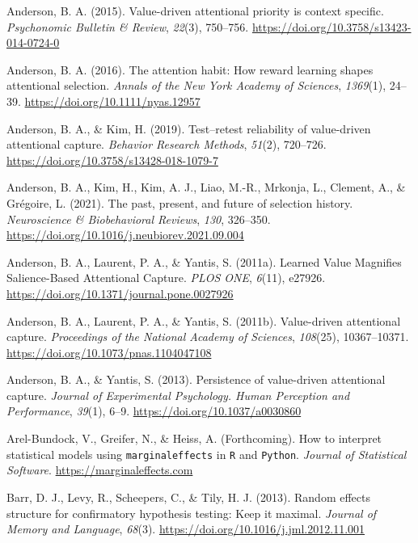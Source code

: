\documentclass[
  man,
  floatsintext,
  longtable,
  nolmodern,
  notxfonts,
  notimes,
  mask,
  colorlinks=true,linkcolor=blue,citecolor=blue,urlcolor=blue]{apa7}
\newlength{\cslhangindent}
\newenvironment{CSLReferences}[2] %
 {\begin{list}{}{%
  \setlength{\itemindent}{0pt}
  \setlength{\leftmargin}{0pt}
  \setlength{\parsep}{0pt}
  \ifodd #1
   \setlength{\leftmargin}{\cslhangindent}
   \setlength{\itemindent}{-1\cslhangindent}
  \fi
  \setlength{\itemsep}{#2\baselineskip}}}
 {\end{list}}
\begin{document}
\begin{CSLReferences}{1}{0}
Anderson, B. A. (2015). Value-driven attentional priority is context
specific. \emph{Psychonomic Bulletin \& Review}, \emph{22}(3), 750--756.
\url{https://doi.org/10.3758/s13423-014-0724-0}

Anderson, B. A. (2016). The attention habit: How reward learning shapes
attentional selection. \emph{Annals of the New York Academy of
Sciences}, \emph{1369}(1), 24--39.
\url{https://doi.org/10.1111/nyas.12957}

Anderson, B. A., \& Kim, H. (2019). Test--retest reliability of
value-driven attentional capture. \emph{Behavior Research Methods},
\emph{51}(2), 720--726. \url{https://doi.org/10.3758/s13428-018-1079-7}

Anderson, B. A., Kim, H., Kim, A. J., Liao, M.-R., Mrkonja, L., Clement,
A., \& Grégoire, L. (2021). The past, present, and future of selection
history. \emph{Neuroscience \& Biobehavioral Reviews}, \emph{130},
326--350. \url{https://doi.org/10.1016/j.neubiorev.2021.09.004}

Anderson, B. A., Laurent, P. A., \& Yantis, S. (2011a). Learned {Value
Magnifies Salience-Based Attentional Capture}. \emph{PLOS ONE},
\emph{6}(11), e27926. \url{https://doi.org/10.1371/journal.pone.0027926}

Anderson, B. A., Laurent, P. A., \& Yantis, S. (2011b). Value-driven
attentional capture. \emph{Proceedings of the National Academy of
Sciences}, \emph{108}(25), 10367--10371.
\url{https://doi.org/10.1073/pnas.1104047108}

Anderson, B. A., \& Yantis, S. (2013). Persistence of value-driven
attentional capture. \emph{Journal of Experimental Psychology. Human
Perception and Performance}, \emph{39}(1), 6--9.
\url{https://doi.org/10.1037/a0030860}

Arel-Bundock, V., Greifer, N., \& Heiss, A. (Forthcoming). How to
interpret statistical models using \texttt{marginaleffects} in
\texttt{R} and \texttt{Python}. \emph{Journal of Statistical Software}.
\url{https://marginaleffects.com}

Barr, D. J., Levy, R., Scheepers, C., \& Tily, H. J. (2013). Random
effects structure for confirmatory hypothesis testing: Keep it maximal.
\emph{Journal of Memory and Language}, \emph{68}(3).
\url{https://doi.org/10.1016/j.jml.2012.11.001}


\end{CSLReferences}
\end{document}
